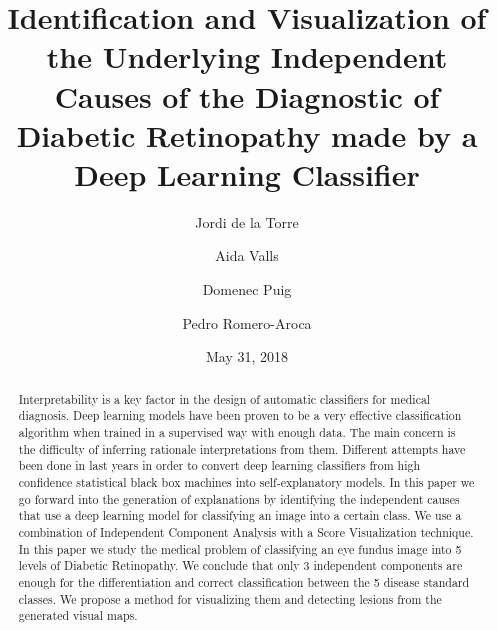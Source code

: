 \documentclass[preprint]{elsarticle}
\theoremstyle{definition} %
\theoremstyle{remark}
\begin{document}
\begin{frontmatter}

\title{Identification and Visualization of the Underlying Independent Causes of the Diagnostic of Diabetic Retinopathy made by a Deep Learning Classifier}

\author[label1]{Jordi de la Torre}
\address[label1]{Departament d'Enginyeria Inform\`atica i Matem\`atiques.\\Escola T\`ecnica Superior d'Enginyeria.\\Universitat Rovira i Virgili\\Avinguda Paisos Catalans, 26. E-43007\\
	Tarragona, Spain}
\author[label1]{Aida Valls}
\author[label1]{Domenec Puig}
\author[label2]{Pedro Romero-Aroca}





\address[label2]{Ophthalmic Service. University Hospital Sant Joan de Reus\\Institut d’Investigaci\'o Sanit\`aria Pere Virgili (IISPV)\\ Universitat Rovira i Virgili\\Reus (Tarragona)\\Avinguda de la Universitat, 1. E-43204\\Reus, Spain}

\date{May 31, 2018}

\begin{abstract}
Interpretability is a key factor in the design of automatic classifiers for medical diagnosis. Deep learning models have been proven to be a very effective classification algorithm when trained in a supervised way with enough data. The main concern is the difficulty of inferring rationale interpretations from them. Different attempts have been done in last years in order to convert deep learning classifiers from high confidence statistical black box machines into self-explanatory models. In this paper we go forward into the generation of explanations by identifying the independent causes that use a deep learning model for classifying an image into a certain class. We use a combination of Independent Component Analysis with a Score Visualization technique. In this paper we study the medical problem of classifying an eye fundus image into 5 levels of Diabetic Retinopathy. We conclude that only 3 independent components are enough for the differentiation and correct classification between the 5 disease standard classes. We propose a method for visualizing them and detecting lesions from the generated visual maps.
\end{abstract}


\end{frontmatter}
\end{document}
